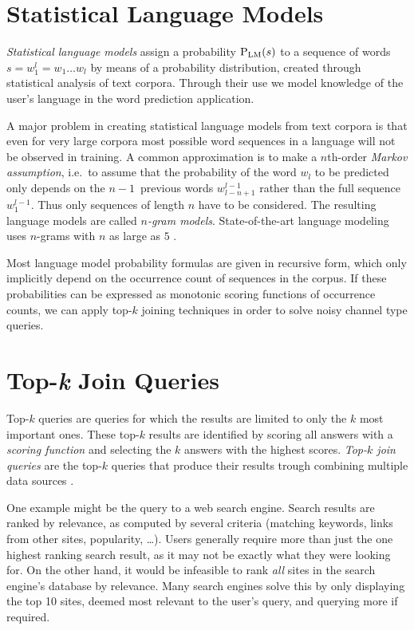 \section{Statistical Language Models}
\label{sec:introduction-langmodels}

\emph{Statistical language models} assign a probability $\Prob[\text{LM}]{s}$ to
a sequence of words $s = w_1^l = w_1 \ldots w_l$ by means of a probability
distribution, created through statistical analysis of text corpora.
Through their use we model knowledge of the user's language in the word
prediction application.

A major problem in creating statistical language models from text corpora is
that even for very large corpora most possible word sequences in a language
will not be observed in training\noref.
A common approximation is to make a $n$th-order \emph{Markov assumption},
i.e.\ to assume that the probability of the word $w_l$ to be predicted only
depends on the $n\!-\!1$~previous words $w_{l-n+1}^{l-1}$ rather than the full
sequence $w_1^{l-1}$.
Thus only sequences of length $n$ have to be considered.
The resulting language models are called \emph{$n$-gram models}.
State-of-the-art language modeling uses $n$-grams with $n$ as large as $5$
\parencite{JurafskyMartin2009,Goodman2001,Stolcke2000}.

Most language model probability formulas are given in recursive form, which only
implicitly depend on the occurrence count of sequences in the corpus\noref.
If these probabilities can be expressed as monotonic scoring functions of
occurrence counts, we can apply top-$k$ joining techniques in order to solve
noisy channel type queries.


\section{Top-\emph{k} Join Queries}
\label{sec:introduction-topkjoin}

Top-$k$ queries are queries for which the results are limited to only the $k$
most important ones.
These top-$k$ results are identified by scoring all answers with a
\emph{scoring function} and selecting the $k$ answers with the highest scores.
\emph{Top-$k$ join queries} are the top-$k$ queries that produce
their results trough combining multiple data sources \parencite{Ilyas2008}.

One example might be the query to a web search engine.
Search results are ranked by relevance, as computed by several criteria
(matching keywords, links from other sites, popularity, \ldots).
Users generally require more than just the one highest ranking search result, as
it may not be exactly what they were looking for.
On the other hand, it would be infeasible to rank \emph{all} sites in the
search engine's database by relevance.
Many search engines solve this by only displaying the top 10 sites, deemed most
relevant to the user's query, and querying more if required.

